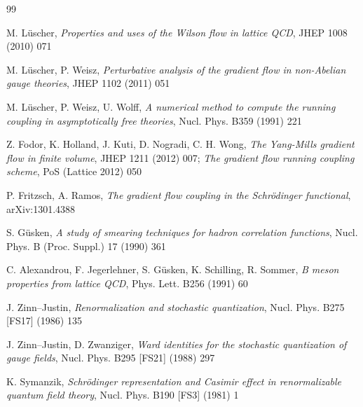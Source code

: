 \bigskip
{}
\medskip
\begin{thebibliography}{99}




M. L\"uscher,
{\it Properties and uses of the Wilson flow in lattice QCD},
JHEP 1008 (2010) 071



M. L\"uscher, P. Weisz,
{\it Perturbative analysis of the gradient flow in non-Abelian gauge
theories},
JHEP 1102 (2011) 051



M. L\"uscher, P. Weisz, U. Wolff,
{\it A numerical method to compute the running coupling in asymptotically 
free theories},
Nucl. Phys. B359 (1991) 221

Z. Fodor, K. Holland, J. Kuti, D. Nogradi, C. H. Wong,
{\it The Yang-Mills gradient flow in finite volume},
JHEP 1211 (2012) 007; {\it The gradient flow running coupling scheme},
PoS (Lattice 2012) 050

P. Fritzsch, A. Ramos,
{\it The gradient flow coupling in the Schr\"odinger functional},
arXiv:1301.4388



S. G\"usken,
{\it A study of smearing techniques for hadron correlation functions},
Nucl. Phys. B (Proc. Suppl.) 17 (1990) 361

C. Alexandrou, F. Jegerlehner, S. G\"usken, K. Schilling, R. Sommer,
{\it B meson properties from lattice QCD},
Phys. Lett. B256 (1991) 60



J. Zinn--Justin,
{\it Renormalization and stochastic quantization},
Nucl. Phys. B275 [FS17] (1986) 135

J. Zinn--Justin, D. Zwanziger, 
{\it Ward identities for the stochastic quantization of gauge fields},
Nucl. Phys. B295 [FS21] (1988) 297



K. Symanzik,
{\it Schr\"odinger representation and Casimir effect in
renormalizable quantum field theory},
Nucl. Phys. B190 [FS3] (1981) 1



\end{thebibliography}
